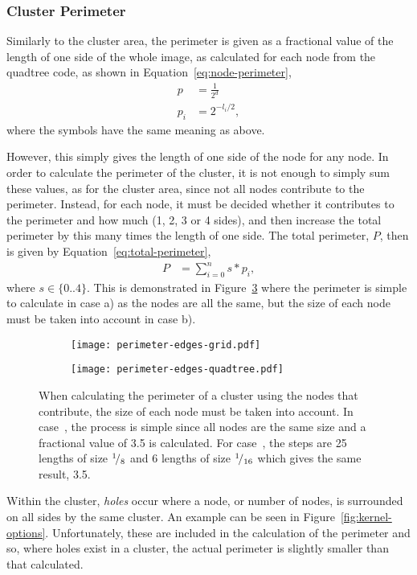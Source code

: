 \subsubsection{Cluster Perimeter}
\label{ssub:Cluster Perimeter}

Similarly to the cluster area, the perimeter is given as a fractional value of
the length of one side of the whole image, as calculated for each node from the
quadtree code, as shown in Equation~\ref{eq:node-perimeter},
\begin{align}
	p &= \frac{1}{2^{d}} \\
	p_i &= 2^{-l_i/2}, \label{eq:node-perimeter}
\end{align}
where the symbols have the same meaning as above.

However, this simply gives the length of one side of the node for any node. In
order to calculate the perimeter of the cluster, it is not enough to simply
sum these values, as for the cluster area, since not all nodes contribute to
the perimeter. Instead, for each node, it must be decided whether it
contributes to the perimeter and how much (1, 2, 3 or 4 sides), and then
increase the total perimeter by this many times the length of one side. The
total perimeter, $P$, then is given by Equation~\ref{eq:total-perimeter},
\begin{align}
	P &= \sum_{i=0}^{n} s * p_i, \label{eq:total-perimeter}
\end{align}
where $s \in \{0..4\}$. This is demonstrated in
Figure~\ref{fig:perimeter-edges} where the perimeter is simple to calculate in
case a) as the nodes are all the same, but the size of each node must be taken
into account in case b).

\begin{figure}[tbhp]
	\centering
	\begin{subfigure}[c]{3.5cm}
		\texttt{[image: perimeter-edges-grid.pdf]}
		\caption{}\label{fig:perimeter-edges-grid.pdf}
	\end{subfigure}%
	\quad
	\begin{subfigure}[c]{3.5cm}
		\texttt{[image: perimeter-edges-quadtree.pdf]}
		\caption{}\label{fig:perimeter-edges-quadtree.pdf}
	\end{subfigure}

	\caption{When calculating the perimeter of a cluster using the nodes that
		contribute, the size of each node must be taken into account. In
		case~, the process is simple since
		all nodes are the same size and a fractional value of 3.5 is
		calculated. For case~, the
		steps are 25 lengths of size ${}^{1}\!/_{8}$ and 6 lengths of size
		${}^{1}\!/_{16}$ which gives the same result, 3.5.}
	\label{fig:perimeter-edges}

\end{figure}

Within the cluster, \emph{holes} occur where a node, or number of nodes, is
surrounded on all sides by the same cluster. An example can be seen in
Figure~\ref{fig:kernel-options}. Unfortunately, these are included in the
calculation of the perimeter and so, where holes exist in a cluster, the actual
perimeter is slightly smaller than that calculated.
